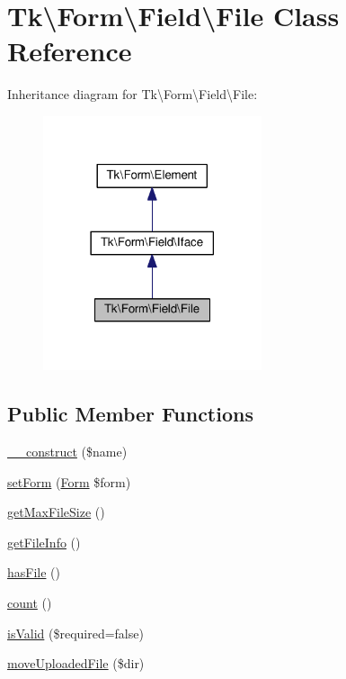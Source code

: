\hypertarget{classTk_1_1Form_1_1Field_1_1File}{\section{Tk\textbackslash{}Form\textbackslash{}Field\textbackslash{}File Class Reference}
\label{classTk_1_1Form_1_1Field_1_1File}
}


Inheritance diagram for Tk\textbackslash{}Form\textbackslash{}Field\textbackslash{}File\+:\nopagebreak
\begin{figure}[H]
\begin{center}
\leavevmode
\includegraphics[width=182pt]{classTk_1_1Form_1_1Field_1_1File__inherit__graph}
\end{center}
\end{figure}
\subsection*{Public Member Functions}
\begin{DoxyCompactItemize}
\item 
\hyperlink{classTk_1_1Form_1_1Field_1_1File_a5cd6d92c83a696b8af00caaea7c7309c}{\+\_\+\+\_\+construct} (\$name)
\item 
\hyperlink{classTk_1_1Form_1_1Field_1_1File_ae2bebe9795936dd80da8df5b4aee0e7e}{set\+Form} (\hyperlink{classTk_1_1Form}{Form} \$form)
\item 
\hyperlink{classTk_1_1Form_1_1Field_1_1File_a81fd8c13f395867c42ee236309d6b72c}{get\+Max\+File\+Size} ()
\item 
\hyperlink{classTk_1_1Form_1_1Field_1_1File_a423acc6e9a9af1a99729b0cbe46db9a7}{get\+File\+Info} ()
\item 
\hyperlink{classTk_1_1Form_1_1Field_1_1File_a83ae34c5096f68cfa9ba43560e8eeb0c}{has\+File} ()
\item 
\hyperlink{classTk_1_1Form_1_1Field_1_1File_a5dd623ac92ad32223cc62152fdc5061e}{count} ()
\item 
\hyperlink{classTk_1_1Form_1_1Field_1_1File_a6fd720acaa328f48183dc66f7192113c}{is\+Valid} (\$required=false)
\item 
\hyperlink{classTk_1_1Form_1_1Field_1_1File_a60c227e20db37a2340e2eeef25e0d615}{move\+Uploaded\+File} (\$dir)
\end{DoxyCompactItemize}
